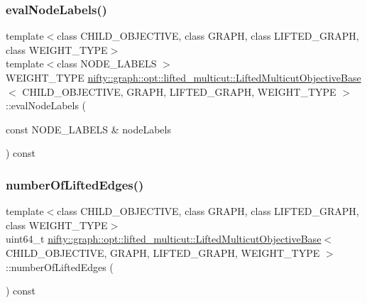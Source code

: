 \subsubsection{\texorpdfstring{eval\+Node\+Labels()}{evalNodeLabels()}}
{\footnotesize\ttfamily template$<$class C\+H\+I\+L\+D\+\_\+\+O\+B\+J\+E\+C\+T\+I\+VE, class G\+R\+A\+PH, class L\+I\+F\+T\+E\+D\+\_\+\+G\+R\+A\+PH, class W\+E\+I\+G\+H\+T\+\_\+\+T\+Y\+PE$>$ \\
template$<$class N\+O\+D\+E\+\_\+\+L\+A\+B\+E\+LS $>$ \\
W\+E\+I\+G\+H\+T\+\_\+\+T\+Y\+PE \hyperlink{classnifty_1_1graph_1_1opt_1_1lifted__multicut_1_1LiftedMulticutObjectiveBase}{nifty\+::graph\+::opt\+::lifted\+\_\+multicut\+::\+Lifted\+Multicut\+Objective\+Base}$<$ C\+H\+I\+L\+D\+\_\+\+O\+B\+J\+E\+C\+T\+I\+VE, G\+R\+A\+PH, L\+I\+F\+T\+E\+D\+\_\+\+G\+R\+A\+PH, W\+E\+I\+G\+H\+T\+\_\+\+T\+Y\+PE $>$\+::eval\+Node\+Labels (\begin{DoxyParamCaption}\item[{const N\+O\+D\+E\+\_\+\+L\+A\+B\+E\+LS \&}]{node\+Labels }\end{DoxyParamCaption}) const\hspace{0.3cm}{\ttfamily [inline]}}

\mbox{\label{classnifty_1_1graph_1_1opt_1_1lifted__multicut_1_1LiftedMulticutObjectiveBase_a160eb5442bde1db8baf76698ede37947}} 
\subsubsection{\texorpdfstring{number\+Of\+Lifted\+Edges()}{numberOfLiftedEdges()}}
{\footnotesize\ttfamily template$<$class C\+H\+I\+L\+D\+\_\+\+O\+B\+J\+E\+C\+T\+I\+VE, class G\+R\+A\+PH, class L\+I\+F\+T\+E\+D\+\_\+\+G\+R\+A\+PH, class W\+E\+I\+G\+H\+T\+\_\+\+T\+Y\+PE$>$ \\
uint64\+\_\+t \hyperlink{classnifty_1_1graph_1_1opt_1_1lifted__multicut_1_1LiftedMulticutObjectiveBase}{nifty\+::graph\+::opt\+::lifted\+\_\+multicut\+::\+Lifted\+Multicut\+Objective\+Base}$<$ C\+H\+I\+L\+D\+\_\+\+O\+B\+J\+E\+C\+T\+I\+VE, G\+R\+A\+PH, L\+I\+F\+T\+E\+D\+\_\+\+G\+R\+A\+PH, W\+E\+I\+G\+H\+T\+\_\+\+T\+Y\+PE $>$\+::number\+Of\+Lifted\+Edges (\begin{DoxyParamCaption}{ }\end{DoxyParamCaption}) const\hspace{0.3cm}{\ttfamily [inline]}}



